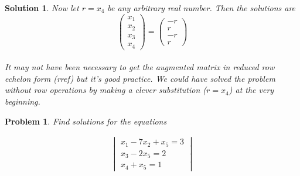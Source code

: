 \documentclass{article}
\newtheorem{problem}{Problem}
\newtheorem*{solution}{Solution}
\begin{document}
\begin{solution}
Now let $r = x_{4}$ be any arbitrary real number. Then the solutions are \\

\begin{equation*}
\begin{pmatrix}
x_{1} \\ x_{2} \\ x_{3} \\ x_{4}
\end{pmatrix}
=
\begin{pmatrix}
-r \\ r \\ -r \\ r
\end{pmatrix}
\end{equation*} \\

It may not have been necessary to get the augmented matrix in reduced row echelon form (rref) but it's good practice. We could have solved the problem without row operations by making a clever substitution ($r = x_{4}$) at the very beginning.

\end{solution}

\begin{problem} 
Find solutions for the equations

\begin{align*}
\begin{vmatrix}
x_{1} - 7x_{2} + x_{5} = 3 \\
x_{3} - 2x_{5} = 2 \\
x_{4} + x_{5} = 1
\end{vmatrix}
\end{align*}
\end{problem}
\end{document}
